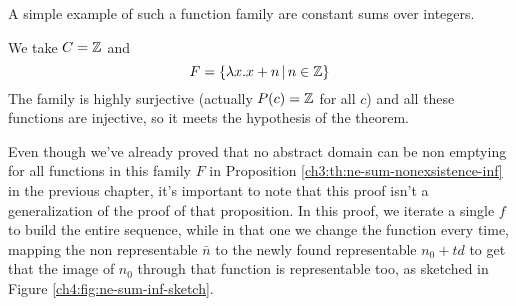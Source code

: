 A simple example of such a function family are constant sums over integers.
\begin{example}
	We take $C = \mathbb{Z}$ and
	\[
	F = \{ \lambda x. x + n \,\vert\, n \in \mathbb{Z} \}
	\]
	The family is highly surjective (actually $P(c) = \mathbb{Z}$ for all $c$) and all these functions are injective, so it meets the hypothesis of the theorem.
\end{example}

Even though we've already proved that no abstract domain can be non emptying for all functions in this family $F$ in Proposition \ref{ch3:th:ne-sum-nonexsistence-inf} in the previous chapter, it's important to note that this proof isn't a generalization of the proof of that proposition. In this proof, we iterate a single $f$ to build the entire sequence, while in that one we change the function every time, mapping the non representable $\bar{n}$ to the newly found representable $n_0 + t d$ to get that the image of $n_0$ through that function is representable too, as sketched in Figure \ref{ch4:fig:ne-sum-inf-sketch}.

\begin{figure*}[ht]
	\centering
	\caption{Graphical representation of the proof of Proposition \ref{ch3:th:ne-sum-nonexsistence-inf}}
	\label{ch4:fig:ne-sum-inf-sketch}
\end{figure*}

